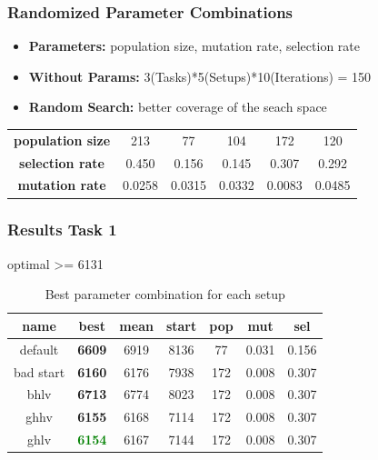 \documentclass[
]{beamer}
\begin{document}
	\begin{frame}
    	\frametitle{Randomized Parameter Combinations}
        
        \begin{itemize}
            \item \textbf{Parameters:} population size, mutation rate, selection rate
            \item \textbf{Without Params:} 3(Tasks)*5(Setups)*10(Iterations) = 150
           	\item \textbf{Random Search:} better coverage of the seach space
		\end{itemize}
		\vfill
        \begin{tabular}{c|c|c|c|c|c}
            \textbf{population size} & 213 & 77 & 104 & 172 & 120\\
            \textbf{selection rate} & 0.450 & 0.156 & 0.145 & 0.307 & 0.292\\
        	\textbf{mutation rate} & 0.0258 & 0.0315 & 0.0332 & 0.0083 & 0.0485
        \end{tabular}
	\end{frame}
    
    \begin{frame}
    	\frametitle{Results Task 1}
        	\begin{minipage}{\linewidth}
              \begin{table} 
              \centering
              \caption{optimal >= 6131}
                  \begin{tabular}{c|ccc|ccc}
                  {\bf name} & {\bf best} & {\bf mean} & {\bf start} & {\bf pop} & {\bf mut} & {\bf sel}\\
                  \toprule[1.pt]
                  default & {\bf 6609} & 6919 & 8136 & 77 & 0.031 & 0.156\\
                  bad start & {\bf 6160} & 6176 & 7938 & 172 & 0.008 & 0.307\\
                  bhlv & {\bf 6713} & 6774 & 8023 & 172 & 0.008 & 0.307\\
                  ghhv & {\bf 6155} & 6168 & 7114 & 172 & 0.008 & 0.307\\
                  ghlv & \textcolor{green}{\bf 6154} & 6167 & 7144 & 172 & 0.008 & 0.307\\
                  \bottomrule[1.pt]
                  \end{tabular}
              \\[10pt]
			  \caption*{Best parameter combination for each setup}
              \end{table}
        	\end{minipage}
    \end{frame}
    
\end{document}
